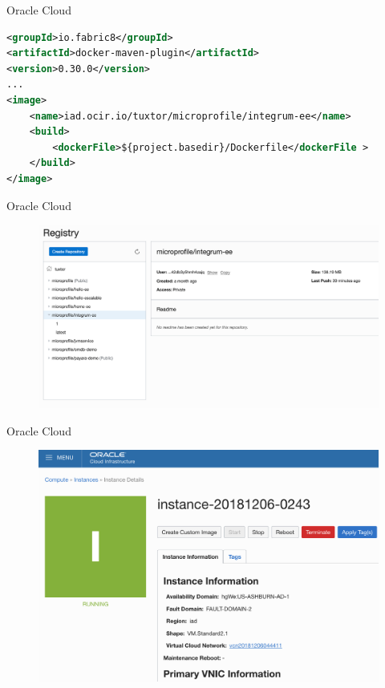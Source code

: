 \documentclass[aspectratio=169]{beamer}
\begin{document}
\begin{frame}[fragile]{Oracle Cloud}
\begin{lstlisting}[language=XML, basicstyle=\scriptsize]
<groupId>io.fabric8</groupId>
<artifactId>docker-maven-plugin</artifactId>
<version>0.30.0</version>
...
<image>
	<name>iad.ocir.io/tuxtor/microprofile/integrum-ee</name>
	<build>
		<dockerFile>${project.basedir}/Dockerfile</dockerFile >
	</build>
</image>
\end{lstlisting}
\end{frame}

\begin{frame}{Oracle Cloud}
\begin{figure}
	\centering
	\includegraphics[width=0.95\linewidth]{Images/oc1}
\end{figure}
\end{frame}

\begin{frame}{Oracle Cloud}
\begin{figure}
	\centering
	\includegraphics[width=0.95\linewidth]{Images/oc2}
\end{figure}
\end{frame}
\end{document}

